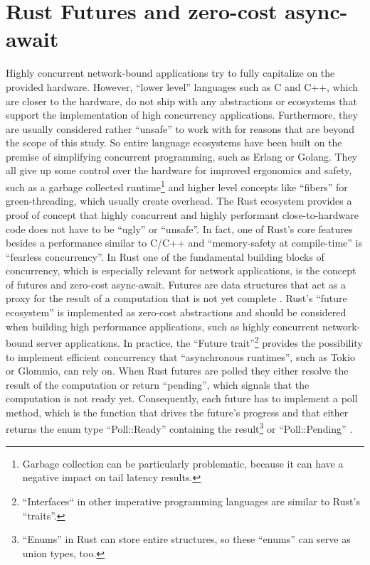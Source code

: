 \section{Rust Futures and zero-cost async-await}
Highly concurrent network-bound applications try to fully capitalize on the provided hardware. However, “lower level” languages such as C and C++, which are closer to the hardware, do not ship with any abstractions or ecosystems that support the implementation of high concurrency applications. Furthermore, they are usually considered rather “unsafe” to work with for reasons that are beyond the scope of this study. So entire language ecosystems have been built on the premise of simplifying concurrent programming, such as Erlang or Golang. They all give up some control over the hardware for improved ergonomics and safety, such as a garbage collected runtime\footnote{Garbage collection can be particularly problematic, because it can have a negative impact on tail latency results.} and higher level concepts like “fibers” for green-threading, which usually create overhead. The Rust ecosystem provides a proof of concept that highly concurrent and highly performant close-to-hardware code does not have to be “ugly” or “unsafe”. In fact, one of Rust’s core features besides a performance similar to C/C++ and “memory-safety at compile-time” is “fearless concurrency”. In Rust one of the fundamental building blocks of concurrency, which is especially relevant for network applications, is the concept of futures and zero-cost async-await.  \newline
Futures are data structures that act as a proxy for the result of a computation that is not yet complete \cite{wikipedia:futures}. Rust’s “future ecosystem” is implemented as zero-cost abstractions and should be considered when building high performance applications, such as highly concurrent network-bound server applications. In practice, the “Future trait”\footnote{“Interfaces“ in other imperative programming languages are similar to Rust’s “traits”.}  provides the possibility to implement efficient concurrency that “asynchronous runtimes”, such as Tokio or Glommio, can rely on.  \newline
When Rust futures are polled they either resolve the result of the computation or return “pending”, which signals that the computation is not ready yet. Consequently, each future has to implement a poll method, which is the function that drives the future’s progress and that either returns the enum type “Poll::Ready” containing the result\footnote{“Enums” in Rust can store entire structures, so these “enums” can serve as union types, too.} or “Poll::Pending” \cite{man:std_future}.  \newline
